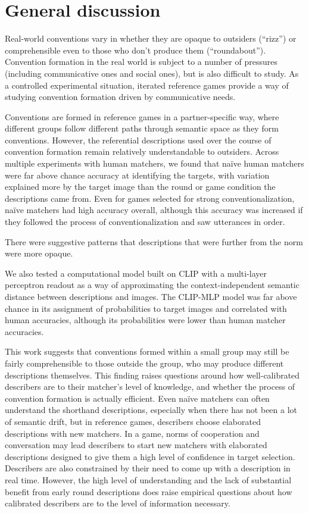\documentclass[10pt, letterpaper]{article}
\begin{document}
\section{General discussion}\label{general-discussion}

Real-world conventions vary in whether they are opaque to outsiders
(``rizz'') or comprehensible even to those who don't produce them
(``roundabout''). Convention formation in the real world is subject to a
number of pressures (including communicative ones and social ones), but
is also difficult to study. As a controlled experimental situation,
iterated reference games provide a way of studying convention formation
driven by communicative needs.

Conventions are formed in reference games in a partner-specific way,
where different groups follow different paths through semantic space as
they form conventions. However, the referential descriptions used over
the course of convention formation remain relatively understandable to
outsiders. Across multiple experiments with human matchers, we found
that naïve human matchers were far above chance accuracy at identifying
the targets, with variation explained more by the target image than the
round or game condition the descriptions came from. Even for games
selected for strong conventionalization, naïve matchers had high
accuracy overall, although this accuracy was increased if they followed
the process of conventionalization and saw utterances in order.

There were suggestive patterns that descriptions that were further from
the norm were more opaque.

We also tested a computational model built on CLIP with a multi-layer
perceptron readout as a way of approximating the context-independent
semantic distance between descriptions and images. The CLIP-MLP model
was far above chance in its assignment of probabilities to target images
and correlated with human accuracies, although its probabilities were
lower than human matcher accuracies.

This work suggests that conventions formed within a small group may
still be fairly comprehensible to those outside the group, who may
produce different descriptions themselves. This finding raises questions
around how well-calibrated describers are to their matcher's level of
knowledge, and whether the process of convention formation is actually
efficient. Even naïve matchers can often understand the shorthand
descriptions, especially when there has not been a lot of semantic
drift, but in reference games, describers choose elaborated descriptions
with new matchers. In a game, norms of cooperation and conversation may
lead describers to start new matchers with elaborated descriptions
designed to give them a high level of confidence in target selection.
Describers are also constrained by their need to come up with a
description in real time. However, the high level of understanding and
the lack of substantial benefit from early round descriptions does raise
empirical questions about how calibrated describers are to the level of
information necessary.
\end{document}
